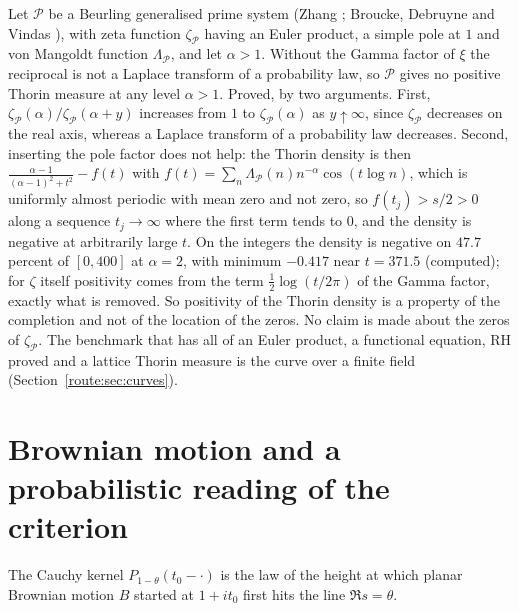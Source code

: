 \begin{remark}\label{bsy:rem:beurling}
Let $\mathcal P$ be a Beurling generalised prime system (Zhang \cite{Zhang07}; Broucke, Debruyne and Vindas \cite{BDV20}), with zeta function $\zeta_{\mathcal P}$ having an Euler product, a simple pole at $1$ and von Mangoldt function $\Lambda_{\mathcal P}$, and let $\alpha>1$. Without the Gamma factor of $\xi$ the reciprocal is not a Laplace transform of a probability law, so $\mathcal P$ gives no positive Thorin measure at any level $\alpha>1$. Proved, by two arguments. First, $\zeta_{\mathcal P}(\alpha)/\zeta_{\mathcal P}(\alpha+y)$ increases from $1$ to $\zeta_{\mathcal P}(\alpha)$ as $y\uparrow\infty$, since $\zeta_{\mathcal P}$ decreases on the real axis, whereas a Laplace transform of a probability law decreases. Second, inserting the pole factor does not help: the Thorin density is then $\frac{\alpha-1}{(\alpha-1)^2+t^2}-f(t)$ with $f(t)=\sum_n\Lambda_{\mathcal P}(n)n^{-\alpha}\cos(t\log n)$, which is uniformly almost periodic with mean zero and not zero, so $f(t_j)>s/2>0$ along a sequence $t_j\to\infty$ where the first term tends to $0$, and the density is negative at arbitrarily large $t$. On the integers the density is negative on $47.7$ percent of $[0,400]$ at $\alpha=2$, with minimum $-0.417$ near $t=371.5$ (computed); for $\zeta$ itself positivity comes from the term $\frac12\log(t/2\pi)$ of the Gamma factor, exactly what is removed. So positivity of the Thorin density is a property of the completion and not of the location of the zeros. No claim is made about the zeros of $\zeta_{\mathcal P}$. The benchmark that has all of an Euler product, a functional equation, RH proved and a lattice Thorin measure is the curve over a finite field (Section~\ref{route:sec:curves}).
\end{remark}

\section{Brownian motion and a probabilistic reading of the criterion}\label{bsy:sec:bm}

The Cauchy kernel $P_{1-\theta}(t_0-\cdot)$ is the law of the height at which planar Brownian motion $B$ started at $1+it_0$ first hits the line $\Re s=\theta$.

